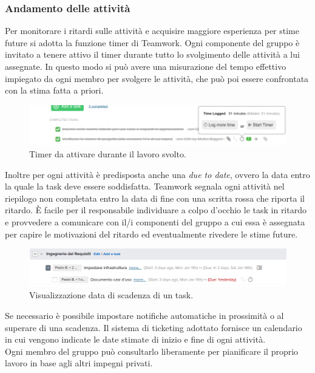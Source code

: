 \documentclass[a4paper]{article}
\begin{document}
			\subsubsection{Andamento delle attività}
				Per monitorare i ritardi sulle attività e acquisire maggiore esperienza per stime future si adotta la 
				funzione timer di Teamwork. Ogni componente del gruppo è invitato a tenere attivo il timer durante 
				tutto lo svolgimento delle attività a lui assegnate. In questo modo si può avere una misurazione del 
				tempo effettivo impiegato da ogni membro per svolgere le attività, che può poi essere confrontata con 
				la stima fatta a priori.
				\begin{figure}[H]
					\centering
					\includegraphics[scale=0.4]{teamworkTimer}
					\caption{Timer da attivare durante il lavoro svolto.}
				\end{figure}
				Inoltre per ogni attività è predisposta anche una \emph{due to date}, ovvero la data entro la quale la task deve 
				essere soddisfatta. Teamwork segnala ogni attività nel riepilogo non completata entro la data di fine con 
				una scritta rossa che riporta il ritardo. È facile per il responsabile individuare a colpo d'occhio le 
				task in ritardo e provvedere a comunicare con il/i componenti del gruppo a cui essa è assegnata per capire 
				le motivazioni del ritardo ed eventualmente rivedere le stime future.
				\begin{figure}[H]
					\centering
					\includegraphics[scale=0.4]{teamworkTaskinRitardo}
					\caption{Visualizzazione data di scadenza di un task.}
				\end{figure}
				Se necessario è possibile impostare notifiche automatiche in prossimità o al superare di una scadenza.
				Il sistema di ticketing adottato fornisce un calendario in cui vengono indicate le date stimate di inizio e fine
				di ogni attività.\\
				Ogni membro del gruppo può consultarlo liberamente per pianificare il proprio lavoro in base agli altri
				impegni privati.
				
\end{document}
